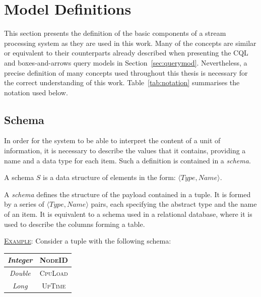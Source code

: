 \section{Model Definitions}
\label{sec:definitions}
This section presents the definition of the basic components of a stream processing system as
they are used in this work. Many of the concepts are similar or equivalent to their
counterparts already described when presenting the CQL and boxes-and-arrows query models in
Section~\ref{sec:querymod}.
Nevertheless, a precise definition of many concepts used throughout this thesis is necessary for the correct
understanding of this work. Table~\ref{tab:notation} summarises the notation used below.
\subsection*{Schema}
In order for the system to be able to interpret the content of a unit of information, it is necessary to
describe the values that it contains, providing a name and a data type for each item. 
Such a definition is contained in a \emph{schema}.
\begin{definition}[Schema]{ 
A schema $S$ is a data structure of elements in the form: $\langle Type, Name \rangle$.}
\end{definition}
A \textit{schema} defines the structure of the payload contained in a tuple. It is formed by a series
of $\langle Type, Name \rangle$ pairs, each specifying the abstract type and the name of an item. It
is equivalent to a schema used in a relational database, where it is used to describe the columns forming a
table. 

\underline{\textsc{Example}}: Consider a tuple with the following schema:\\

\begin{table}[th!]
	\centering
	\begin{tabular}{|c||c|} \hline
	\textit{Integer} 	&	\textsc{NodeID}		\\	\hline
	\textit{Double}		&	\textsc{CpuLoad}	\\	\hline
	\textit{Long}		&	\textsc{UpTime}		\\	\hline
	\end{tabular}
	
	\label{table:schema}
\end{table}

